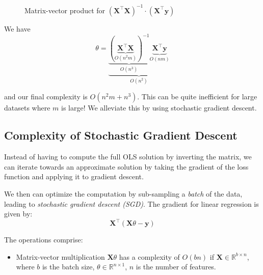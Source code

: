 \begin{enumerate}
\begin{figure}[h!]
              \caption{Matrix-vector product for $(\bm{X}^\top \bm{X})^{-1} \cdot (\bm{X}^\top \bm{y})$}
              \label{fig:matrix_vector_product_2}
          \end{figure}



          We have
          \begin{equation}
              \theta =
              \underbrace{
                  \underbrace{
                      \left( \underbrace{\bm{X}^\top \bm{X}}_{O(n^2m)} \right)^{-1}
                  }_{O(n^3)}
                  \underbrace{
                      \bm{X}^\top \bm{y}
                  }_{O(nm)}}_{O(n^2)}
          \end{equation}

          and our final complexity is \( O(n^2 m + n^3) \). This can be quite inefficient for large datasets where $m$ is large! We alleviate this by using stochastic gradient descent.

          \subsection{Complexity of Stochastic Gradient Descent}

          Instead of having to compute the full OLS solution by inverting the matrix, we can iterate towards an approximate solution by taking the gradient of the loss function and applying it to gradient descent. \bigskip

          We then can optimize the computation by sub-sampling a \textit{batch} of the data, leading to \textit{stochastic gradient descent (SGD)}. The gradient for linear regression is given by:
          \[
              \bm{X}^\top (\bm{X} \theta - \bm{y})
          \]

          The operations comprise:
          \begin{itemize}
              \item Matrix-vector multiplication \( \bm{X} \theta \) has a complexity of \( O(b n) \) if \( \bm{X} \in \mathbb{R}^{b \times n} \), where \( b \) is the batch size, $\theta \in \mathbb{R}^{n \times 1}$, $n$ is the number of features.


\end{itemize}
\end{enumerate}
